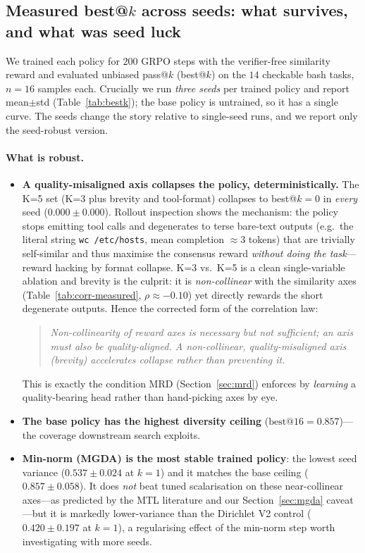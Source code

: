 \documentclass[11pt,a4paper]{article}
\begin{document}
\subsection{Measured best@$k$ across seeds: what survives, and what was seed luck}
\label{sec:exp-bestk}

We trained each policy for $200$ GRPO steps with the verifier-free similarity
reward and evaluated unbiased pass@$k$ (best@$k$) on the $14$ checkable bash
tasks, $n{=}16$ samples each.  Crucially we run \emph{three seeds} per trained
policy and report mean$\pm$std (Table~\ref{tab:bestk}); the base policy is
untrained, so it has a single curve.  The seeds change the story relative to
single-seed runs, and we report only the seed-robust version.

\paragraph{What is robust.}
\begin{itemize}[nosep]
\item \textbf{A quality-misaligned axis collapses the policy, deterministically.}
  The K=5 set (K=3 plus brevity and tool-format) collapses to best@$k=0$ in
  \emph{every} seed ($0.000\pm0.000$).  Rollout inspection shows the mechanism:
  the policy stops emitting tool calls and degenerates to terse bare-text
  outputs (e.g.\ the literal string \texttt{wc /etc/hosts}, mean completion
  $\approx 3$ tokens) that are trivially self-similar and thus maximise the
  consensus reward \emph{without doing the task}---reward hacking by format
  collapse.  K=3 vs.\ K=5 is a clean single-variable ablation and brevity is the
  culprit: it is \emph{non-collinear} with the similarity axes
  (Table~\ref{tab:corr-measured}, $\rho\approx-0.10$) yet directly rewards the
  short degenerate outputs.  Hence the corrected form of the correlation law:
  \begin{quote}\emph{Non-collinearity of reward axes is necessary but not
  sufficient; an axis must also be quality-aligned.  A non-collinear,
  quality-misaligned axis (brevity) accelerates collapse rather than preventing
  it.}\end{quote}
  This is exactly the condition MRD (Section~\ref{sec:mrd}) enforces by
  \emph{learning} a quality-bearing head rather than hand-picking axes by eye.
\item \textbf{The base policy has the highest diversity ceiling}
  ($\text{best@}16 = 0.857$)---the coverage downstream search exploits.
\item \textbf{Min-norm (MGDA) is the most stable trained policy}: the lowest seed
  variance ($0.537\pm0.024$ at $k{=}1$) and it matches the base ceiling
  ($0.857\pm0.058$).  It does \emph{not} beat tuned scalarisation on these
  near-collinear axes---as predicted by the MTL literature and our
  Section~\ref{sec:mgda} caveat---but it is markedly lower-variance than the
  Dirichlet V2 control ($0.420\pm0.197$ at $k{=}1$), a regularising effect of
  the min-norm step worth investigating with more seeds.
\end{itemize}
\end{document}
